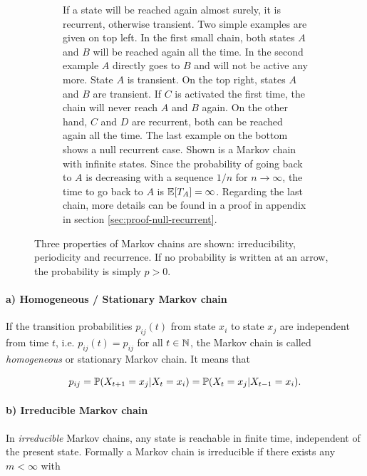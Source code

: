 \begin{figure}
\begin{subfigure}{\textwidth}
        \vspace{5pt}
        \caption{If a state will be reached again almost surely, it is recurrent, otherwise transient. Two simple examples are given on top left. In the first small chain, both states $A$ and $B$ will be reached again all the time. In the second example $A$ directly goes to $B$ and will not be active any more. State $A$ is transient. On the top right, states $A$ and $B$ are transient. If $C$ is activated the first time, the chain will never reach $A$ and $B$ again. On the other hand, $C$ and $D$ are recurrent, both can be reached again all the time. The last example on the bottom shows a null recurrent case. Shown is a Markov chain with infinite states. Since the probability of going back to $A$ is decreasing with a sequence $1/n$ for $n \to\infty$, the time to go back to $A$ is $\mathbb{E}[T_A] = \infty$. Regarding the last chain, more details can be found in a proof in appendix in section \ref{sec:proof-null-recurrent}.}
        \label{fig:recurrent}
    \end{subfigure}
    \caption[Markov chain properties]{Three properties of Markov chains are shown: irreducibility, periodicity and recurrence. If no probability is written at an arrow, the probability is simply $p > 0$.}
    \label{fig:mc-properties}
\end{figure}

\paragraph{a) Homogeneous / Stationary Markov chain}

If the transition probabilities $p_{ij}(t)$ from state $x_i$ to state $x_j$ are independent from time $t$, i.e. $p_{ij}(t) = p_{ij}$ for all $t\in\mathbb{N}$, the Markov chain is called \emph{homogeneous} or stationary Markov chain. It means that

\begin{equation}
\label{eq:markov-homo}
p_{ij} = \mathbb{P}(X_{t+1} = x_j | X_t = x_i) =  \mathbb{P}(X_t = x_j | X_{t-1} = x_i).
\end{equation}

\paragraph{b) Irreducible Markov chain}

In \emph{irreducible} Markov chains, any state is reachable in finite time, independent of the present state. Formally a Markov chain is irreducible if there exists any $m < \infty$ with


